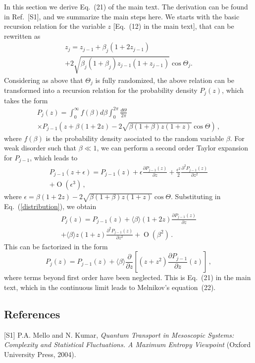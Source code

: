 \documentclass[ prl, twocolumn, superscriptaddress, amsfonts, amsmath,floatfix]{revtex4-1}
\begin{document}
In this section we derive Eq.~(21) of the main text. The derivation can be found in Ref.~[S1], and we summarize the main steps here. We starts with the basic recursion relation for the variable $z$ [Eq.~(12) in the main text], that can be rewritten as
\begin{multline}
   z_j=z_{j-1}+\beta_j(1+2z_{j-1})
\\
      +2\sqrt{\beta_j(1+\beta_j)z_{j-1}(1+z_{j-1})}\cos\Theta_j.
\end{multline}
Considering as above that $\Theta_j$ is fully randomized, the above relation can be transformed into a recursion relation for
the probability density $P_j(z)$, which takes the form
\begin{multline}\label{distribution}
   P_j(z) = \int_0^{\infty}f(\beta)d\beta\int_0^{2\pi}\frac{d\Theta}{2\pi}
\\\times
      P_{j-1}\left(z+\beta(1+2z)-2\sqrt{\beta(1+\beta)z(1+z)}\cos\Theta\right) \, ,
\end{multline}
where $f(\beta)$ is the probability density asociated to the random variable $\beta$. For weak disorder such that
$\beta\ll 1$, we can perform a second order Taylor expansion for $P_{j-1}$, which leads to
\begin{multline}
   P_{j-1}(z+\epsilon)= P_{j-1}(z)
      +\epsilon\frac{\partial P_{j-1}(z)}{\partial z}
      +\frac{\epsilon^2}{2}\frac{\partial^2 P_{j-1}(z)}{\partial z^2}
\\
      +\operatorname{O}(\epsilon^3) \, ,
\end{multline}
where $\epsilon=\beta(1+2z)-2\sqrt{\beta(1+\beta)z(1+z)}\cos\Theta$.
Substituting in Eq.~(\ref{distribution}), we obtain
\begin{multline}
   P_j(z) = P_{j-1}(z)+\langle\beta\rangle(1+2z)\frac{\partial P_{j-1}(z)}{\partial z}
\\
      +\langle\beta\rangle z(1+z)\frac{\partial^2 P_{j-1}(z)}{\partial z^2}
      +\operatorname{O}(\beta^2) \, .
\end{multline}
This can be factorized in the form
\begin{equation}
   P_j(z) = P_{j-1}(z) + \langle \beta \rangle \frac{\partial}{\partial z}
      \left [(z+z^2)  \frac{\partial P_{j-1}}{\partial z}(z) \right ] \, ,
\end{equation}
where terms beyond first order have been neglected. This is Eq.~(21) in the main text, which in the continuous
limit leads to Melnikov's equation~(22). 

\subsection*{References}
[S1] P.A. Mello and N. Kumar, {\it Quantum Transport in Mesoscopic Systems: Complexity and Statistical Fluctuations. A Maximum Entropy Viewpoint} (Oxford University Press, 2004).
\end{document}

